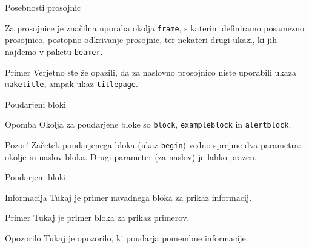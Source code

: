 \begin{frame}{Posebnosti prosojnic}

	Za prosojnice je značilna uporaba okolja \texttt{frame}, 
	s katerim definiramo posamezno prosojnico, \pause
	postopno odkrivanje prosojnic, \pause
	ter nekateri drugi ukazi, ki jih najdemo v paketu \texttt{beamer}. \pause
	\begin{exampleblock}{Primer}
		Verjetno ste že opazili, da za naslovno prosojnico niste uporabili
		ukaza \texttt{maketitle}, ampak ukaz \texttt{titlepage}.
	\end{exampleblock}
\end{frame}

\begin{frame}{Poudarjeni bloki}
       \begin{block}{Opomba}
		Okolja za poudarjene bloke so \texttt{block}, \texttt{exampleblock} in \texttt{alertblock}.
	   \end{block}
		
	   \begin{alertblock}{Pozor!}
	   Začetek poudarjenega bloka (ukaz \texttt{begin}) vedno sprejme 
		dva parametra: okolje in naslov bloka.
		Drugi parameter (za naslov) je lahko prazen.
	   \end{alertblock} 
	
\end{frame}

\begin{frame}{Poudarjeni bloki}
    \begin{block}{Informacija}
        Tukaj je primer navadnega bloka za prikaz informacij.
    \end{block}
    \pause
    \begin{exampleblock}{Primer}
        Tukaj je primer bloka za prikaz primerov.
    \end{exampleblock}
    \pause
    \begin{alertblock}{Opozorilo}
        Tukaj je opozorilo, ki poudarja pomembne informacije.
    \end{alertblock}
\end{frame}

